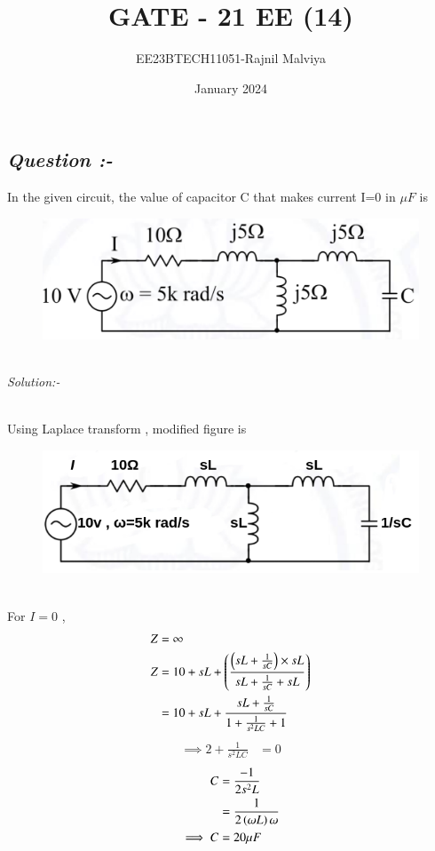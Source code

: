 \documentclass[journal,12pt,twocolumn]{IEEEtran}
\theoremstyle{remark}
\begin{document}
\title{GATE - 21 EE (14)}
\author{EE23BTECH11051-Rajnil Malviya}
\date{January 2024}
\maketitle
\subsection*{\textit{Question :-}}
In the given circuit, the value of capacitor C that makes current
I=0 in $\mu F$ is \\
\begin{figure}[h!]
   \includegraphics[width=1\linewidth]{figs/qf1.png}
\end{figure}\\
\textit{Solution:- }
\begin{table}[h!]
            
    \end{table}\\
Using Laplace transform , modified figure is 
\begin{figure}[h!]
   \includegraphics[width=1\linewidth]{figs/f2.png}
\end{figure}\\
For $I=0 $ , 
\begin{align}
Z & =\infty\\
    Z&=10+sL+\left(\frac{\left(sL+\frac{1}{sC}\right)\times sL}{sL+\frac{1}{sC}+ sL}\right)\\
&=10+sL+\frac{sL+\frac{1}{sC}}{1+\frac{1}{s^{2}LC}+1}
\end{align}
\begin{align}
 \implies   2+\frac{1}{s^{2}LC}&=0
\end{align}
\begin{align}
     C&=\frac{-1}{2s^2L}\\
       &=\frac{1}{2\left(\omega L\right)\omega }\\
       \implies C&= 20\mu F
\end{align}
\end{document}
